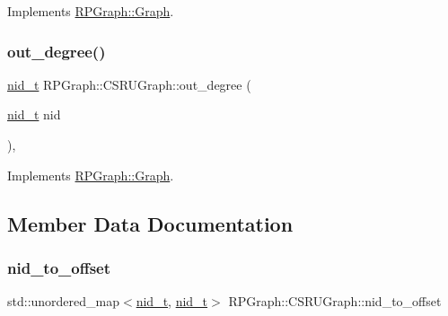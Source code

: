 Implements \mbox{\hyperlink{classRPGraph_1_1Graph_ab5602e6b776a0ea3b944775331fcb2aa}{R\+P\+Graph\+::\+Graph}}.

\mbox{\label{classRPGraph_1_1CSRUGraph_a952e2a8eea28c0d879a0b5688d0e1b06}} 
\subsubsection{\texorpdfstring{out\+\_\+degree()}{out\_degree()}}
{\footnotesize\ttfamily \mbox{\hyperlink{namespaceRPGraph_ab3ae34f1ab88e48f43794c30c8697b74}{nid\+\_\+t}} R\+P\+Graph\+::\+C\+S\+R\+U\+Graph\+::out\+\_\+degree (\begin{DoxyParamCaption}\item[{\mbox{\hyperlink{namespaceRPGraph_ab3ae34f1ab88e48f43794c30c8697b74}{nid\+\_\+t}}}]{nid }\end{DoxyParamCaption})\hspace{0.3cm}{\ttfamily [override]}, {\ttfamily [virtual]}}



Implements \mbox{\hyperlink{classRPGraph_1_1Graph_a660ad58e03df7e3cc00d0eb4e5c16819}{R\+P\+Graph\+::\+Graph}}.



\subsection{Member Data Documentation}
\mbox{\label{classRPGraph_1_1CSRUGraph_a4d831eac19d0c676ff02e542250d429c}} 
\subsubsection{\texorpdfstring{nid\+\_\+to\+\_\+offset}{nid\_to\_offset}}
{\footnotesize\ttfamily std\+::unordered\+\_\+map$<$\mbox{\hyperlink{namespaceRPGraph_ab3ae34f1ab88e48f43794c30c8697b74}{nid\+\_\+t}}, \mbox{\hyperlink{namespaceRPGraph_ab3ae34f1ab88e48f43794c30c8697b74}{nid\+\_\+t}}$>$ R\+P\+Graph\+::\+C\+S\+R\+U\+Graph\+::nid\+\_\+to\+\_\+offset}

